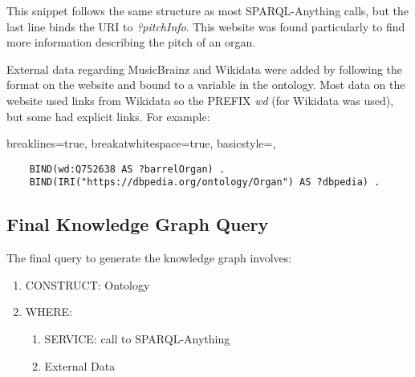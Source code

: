 This snippet follows the same structure as most SPARQL-Anything calls, but the last line binds the URI to \textit{?pitchInfo}. This website was found particularly to find more information describing the pitch of an organ. 

External data regarding MusicBrainz and Wikidata were added by following the format on the website and bound to a variable in the ontology. Most data on the website used links from Wikidata so the PREFIX \textit{wd} (for Wikidata was used), but some had explicit links. For example:

\lstset
{
    breaklines=true,
    breakatwhitespace=true,
    basicstyle=\ttfamily,
}
\begin{lstlisting}
    BIND(wd:Q752638 AS ?barrelOrgan) . 
    BIND(IRI("https://dbpedia.org/ontology/Organ") AS ?dbpedia) .
\end{lstlisting}

\subsection{Final Knowledge Graph Query}
\hspace*{0.5cm} The final query to generate the knowledge graph involves: 

\begin{enumerate}
    \item CONSTRUCT: Ontology
    \item WHERE:
    \begin{enumerate}
        \item SERVICE: call to SPARQL-Anything
        \item External Data
    \end{enumerate}
\end{enumerate}

